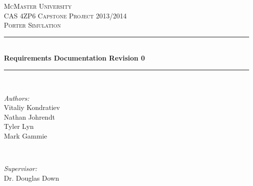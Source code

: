 \documentclass[paper=letter, fontsize=10pt]{scrartcl}
\numberwithin{equation}{section}		%
\numberwithin{figure}{section}			%
\numberwithin{table}{section}				%
\begin{document}
\begin{titlepage}

\newcommand{\HRule}{\rule{\linewidth}{0.5mm}} %

\begin{center}
 

\textsc{\LARGE McMaster University}\\[1.5cm] %
\textsc{\Large CAS 4ZP6 Capstone Project 2013/2014}\\[0.5cm] %
\textsc{\large Porter Simulation}\\[0.5cm] %


\HRule \\[0.4cm]
{ \huge \bfseries Requirements Documentation Revision 0}\\[0.4cm] %
\HRule \\[1.5cm]
 

\begin{minipage}{0.4\textwidth}
\begin{flushleft} \large
\emph{Authors:}\\
Vitaliy Kondratiev\\
Nathan Johrendt\\
Tyler Lyn\\
Mark Gammie
\end{flushleft}
\end{minipage}
~
\begin{minipage}{0.4\textwidth}
\begin{flushright} \large
\emph{Supervisor:} \\
Dr. Douglas Down %
\end{flushright}
\end{minipage}\\[4cm]


\end{center}
\end{titlepage}
\end{document}
